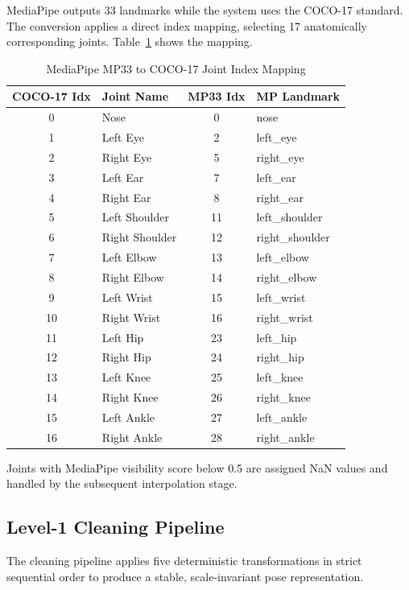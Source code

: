 \begin{sloppypar}
MediaPipe outputs 33 landmarks while the system uses the COCO-17 standard. The conversion applies a direct index mapping, selecting 17 anatomically corresponding joints. Table~\ref{tab:joint_mapping} shows the mapping.

\begin{table}[H]
\centering
\caption{MediaPipe MP33 to COCO-17 Joint Index Mapping}
\label{tab:joint_mapping}
\begin{tabular}{|c|l|c|l|}
\hline
\textbf{COCO-17 Idx} & \textbf{Joint Name} & \textbf{MP33 Idx} & \textbf{MP Landmark} \\
\hline
0 & Nose & 0 & nose \\
1 & Left Eye & 2 & left\_eye \\
2 & Right Eye & 5 & right\_eye \\
3 & Left Ear & 7 & left\_ear \\
4 & Right Ear & 8 & right\_ear \\
5 & Left Shoulder & 11 & left\_shoulder \\
6 & Right Shoulder & 12 & right\_shoulder \\
7 & Left Elbow & 13 & left\_elbow \\
8 & Right Elbow & 14 & right\_elbow \\
9 & Left Wrist & 15 & left\_wrist \\
10 & Right Wrist & 16 & right\_wrist \\
11 & Left Hip & 23 & left\_hip \\
12 & Right Hip & 24 & right\_hip \\
13 & Left Knee & 25 & left\_knee \\
14 & Right Knee & 26 & right\_knee \\
15 & Left Ankle & 27 & left\_ankle \\
16 & Right Ankle & 28 & right\_ankle \\
\hline
\end{tabular}
\end{table}

Joints with MediaPipe visibility score below 0.5 are assigned NaN values and handled by the subsequent interpolation stage.

\subsection{Level-1 Cleaning Pipeline}

The cleaning pipeline applies five deterministic transformations in strict sequential order to produce a stable, scale-invariant pose representation.


\end{sloppypar}
